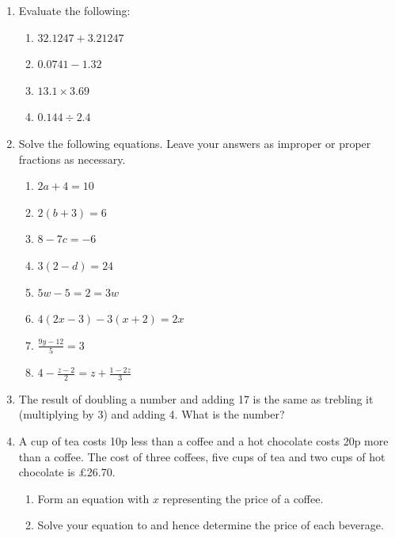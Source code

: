 \documentclass[12pt]{article}
\begin{document}
\begin{enumerate}
    \item Evaluate the following:
    \begin{enumerate}
        \item \(32.1247 + 3.21247\)
        \vspace{4cm}
        \item \(0.0741 - 1.32\)
        \vspace{4cm}
        \item \(13.1 \times 3.69\)
        \vspace{4cm}
        \item \(0.144 \div 2.4\)
        \vspace{4cm}
    \end{enumerate}

    \newpage
    
    \item Solve the following equations. Leave your answers as improper or proper fractions as necessary.
    \begin{enumerate}
        \item \(2a+4=10\)
        \vspace{4cm}
        \item \(2(b+3)=6\)
        \vspace{4cm}
        \item \(8-7c=-6\)
        \vspace{4cm}
        \item \(3(2-d)=24\)
        \newpage
        \item \(5w-5=2=3w\)
        \vspace{4cm}
        \item \(4(2x-3)-3(x+2) = 2x\)
        \vspace{4cm}
        \item \(\frac{9y-12}{5}=3\)
        \vspace{4cm}
        \item \(4-\frac{z-2}{2}=z+\frac{1-2z}{3}\)
    \end{enumerate}

    \newpage

    \item The result of doubling a number and adding 17 is the same as trebling it (multiplying by 3) and adding 4. What is the number?

    \vspace{8cm}

    \item A cup of tea costs 10p less than a coffee and a hot chocolate costs 20p more than a coffee. The cost of three coffees, five cups of tea and two cups of hot chocolate is £26.70.

    \begin{enumerate}
        \item Form an equation with \(x\) representing the price of a coffee.
        \item Solve your equation to and hence determine the price of each beverage.
    \end{enumerate}
\end{enumerate}
\end{document}
